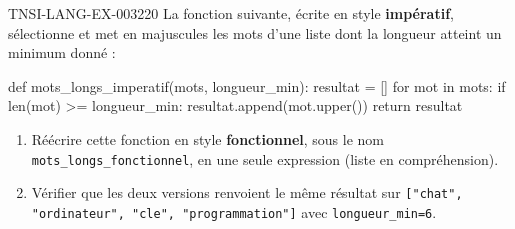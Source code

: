 \begin{exercice}{TNSI-LANG-EX-003}{2}{20}
La fonction suivante, écrite en style \textbf{impératif}, sélectionne et met en majuscules les mots d'une liste dont la longueur atteint un minimum donné :
\begin{python}
def mots_longs_imperatif(mots, longueur_min):
    resultat = []
    for mot in mots:
        if len(mot) >= longueur_min:
            resultat.append(mot.upper())
    return resultat
\end{python}
\begin{enumerate}
  \item Réécrire cette fonction en style \textbf{fonctionnel}, sous le nom \lstinline{mots_longs_fonctionnel}, en une seule expression (liste en compréhension).
  \item Vérifier que les deux versions renvoient le même résultat sur \lstinline{["chat", "ordinateur", "cle", "programmation"]} avec \lstinline{longueur_min=6}.
\end{enumerate}
\end{exercice}
